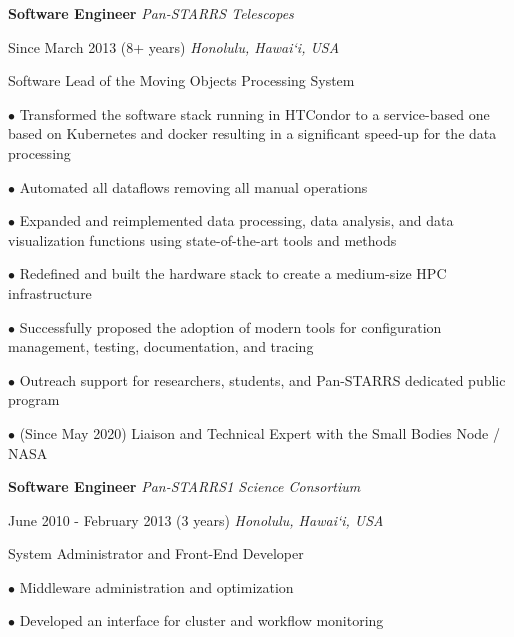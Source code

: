 \documentclass[12pt]{article}
\newcommand{\mynewsection}[2]{%
  \medskip

  \textbf{\color{colorsection}\LARGE {#1}\hspace{0.25in}{#2}}
}
\newcommand{\experience}[4]{%
  \medskip
  {\color{colorsection}\textbf{\large #1}}
  \hfill
  \textit{\small #2}

  {\small #3}
  \hfill    
  \textit{\small #4}}
\begin{document}
\begin{minipage}[t]{0.67\linewidth}
  \mynewsection{\faBriefcase}{Experience}
  
  \bigskip

  \experience{Software Engineer}{Pan-STARRS Telescopes}{Since March
    2013 (8+ years)}{Honolulu, Hawai`i, USA}

  \bigskip
  
  {\large Software Lead of the Moving Objects Processing System}

  \bigskip
  
  $\bullet$ Transformed the software stack running in HTCondor to a
  service-based one based on Kubernetes and docker resulting in a
  significant speed-up for the data processing

  \medskip
  
  $\bullet$ Automated all dataflows removing all manual
  operations

  \medskip

  $\bullet$ Expanded and reimplemented data processing, data analysis,
  and data visualization functions using state-of-the-art tools and
  methods

  \medskip

  $\bullet$ Redefined and built the hardware stack to create a
  medium-size HPC infrastructure
  
  \medskip

  $\bullet$ Successfully proposed the adoption of modern tools for
  configuration management, testing, documentation, and tracing

  \medskip

  $\bullet$ Outreach support for researchers, students, and Pan-STARRS
  dedicated public program

  \medskip

  $\bullet$ (Since May 2020) Liaison and Technical Expert with the Small Bodies
  Node / NASA

  \bigskip
  
  \experience{Software Engineer}{Pan-STARRS1 Science Consortium}{June
    2010 - February 2013 (3 years)}{Honolulu, Hawai`i, USA}

  \bigskip

  {\large System Administrator and Front-End Developer}
  
  \medskip

  $\bullet$ Middleware administration and optimization

  \medskip
  
  $\bullet$ Developed an interface for cluster and workflow monitoring
\end{minipage}
\end{document}

